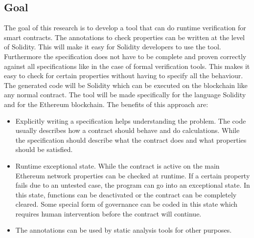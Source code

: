 \documentclass[a4paper]{article}
\begin{document}
\subsection{Goal}
The goal of this research is to develop a tool that can do runtime verification for smart contracts. The annotations to check properties can be written at the level of Solidity. This will make it easy for Solidity developers to use the tool. Furthermore the specification does not have to be complete and proven correctly against all specifications like in the case of formal verification tools. This makes it easy to check for certain properties without having to specify all the behaviour. The generated code will be Solidity which can be executed on the blockchain like any normal contract. The tool will be made specifically for the language Solidity and for the Ethereum blockchain.
The benefits of this approach are:
\begin{itemize}
  \item Explicitly writing a specification helps understanding the problem. The code usually describes how a contract should behave and do calculations. While the specification should describe what the contract does and what properties should be satisfied.
  \item Runtime exceptional state. While the contract is active on the main Ethereum network properties can be checked at runtime. If a certain property fails due to an untested case, the program can go into an exceptional state. In this state, functions can be deactivated or the contract can be completely cleared. Some special form of governance can be coded in this state which requires human intervention before the contract will continue.
  \item The annotations can be used by static analysis tools for other purposes.
\end{itemize}
\end{document}
